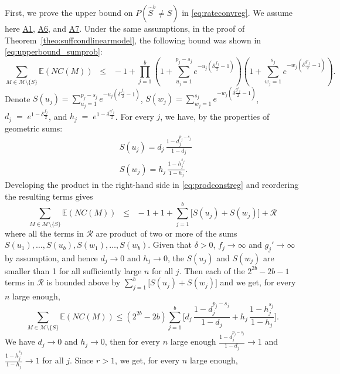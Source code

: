 \documentclass[bj,authoryear]{imsart}
\theoremstyle{plain}
\newcommand{\piotr}[1]{{\small{\color{red} \sf $\clubsuit$ Piotr: #1}}}
\newcommand{\E}{\mathbb{E}}
\newcommand{\M}{\mathcal{M}}
\begin{document}
First, we prove the upper bound on $P(\hat{S}^b \neq S)$ in \eqref{eq:rateconvreg}. We assume here \hyperlink{lab:A1}{A1}, \hyperlink{lab:A6}{A6}, and \hyperlink{lab:A7}{A7}. Under the same assumptions, in the proof of Theorem~\ref{theo:suffcondlinearmodel}, the following bound was shown in \eqref{eq:upperbound_sumprob}:
\begin{equation}\label{eq:prodconstreg}
 \sum_{M \in \M\setminus \{S\}} \E\left(NC(M)\right)
    \;\;\leq\;\; - 1+\prod_{j=1}^b\left(1+\sum_{u_j=1}^{p_j-s_j}e^{-u_j\left(\delta \tfrac{f_j}{2}-1\right)}\right)\left(1+
    \sum_{w_j=1}^{s_j}    e^{-w_j\left(\delta \tfrac{g'_j}{2}-1\right)}\right) .
\end{equation}
Denote $S(u_j)=\sum_{u_j=1}^{p_j-s_j}e^{-u_j\left(\delta \tfrac{f_j}{2}-1\right)}$,  $S(w_j)=\sum_{w_j=1}^{s_j}    e^{-w_j\left(\delta \tfrac{g'_j}{2}-1\right)}$, $d_j\;=\;e^{1-\delta \tfrac{f_j}{2}}$, and $h_j\;=\;e^{1-\delta \tfrac{g'_j}{2}}$. For every $j$, we have, by the properties of geometric sums:
\begin{align*}
    &S(u_j)
    =d_j\,\frac{1-d_j^{p_j-s_j}}{1-d_j} \\
    &S(w_j) =h_j\,\frac{1-h_j^{s_j}}{1-h_j}.
\end{align*}
Developing the product in the right-hand side in \eqref{eq:prodconstreg} and reordering the resulting terms gives
$$\sum_{M \in \M\setminus \{S\}} \E\left(NC(M)\right)\;\;\leq\;\;-1+1+\sum_{j=1}^b\big[S(u_j)+S(w_j)\big]+\mathcal{R}$$
where all the terms in $\mathcal{R}$ are product of two or more of the sums $S(u_1),\ldots,S(u_b),S(w_1),\ldots,S(w_b)$. Given that $\delta>0$, $f_j \to \infty$ and $g_j' \to \infty$ by assumption, and hence $d_j \to 0$ and $h_j \to 0$, the $S(u_j)$ and $S(w_j)$ are smaller than 1 for all sufficiently large $n$ for all $j$. Then each of the $2^{2b}-2b-1$ terms in $\mathcal{R}$ is bounded above by $\sum_{j=1}^b\big[S(u_j)+S(w_j)\big]$ and we get, for every $n$ large enough,
 \begin{equation} \label{eq:fierg}
 \sum_{M \in \M\setminus \{S\}} \E\left(NC(M)\right)
 \leq (2^{2b}-2b)\sum_{j=1}^b \bigg[d_j\,\frac{1-d_j^{p_j-s_j}}{1-d_j}+ h_j\,\frac{1-h_j^{s_j}}{1-h_j}\bigg ]. \end{equation} 
 We have $d_j \to 0$ and $h_j \to 0$, then for every $n$ large enough $\frac{1-d_j^{p_j-s_j}}{1-d_j}\to1$ and $\frac{1-h_j^{s_j}}{1-h_j}\to1$ for all $j$. Since $r>1$, we get, for every $n$ large enough,
\end{document}
